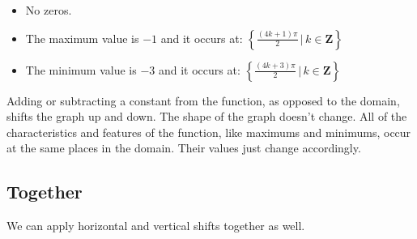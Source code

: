 \documentclass{ximera}
\begin{document}
\begin{example}
\begin{image}
\end{image}



\begin{itemize}
\item No zeros.
\item The maximum value is $-1$ and it occurs at:  $\left\{     \frac{(4k+1)\pi}{2} \, | \, k \in \textbf{Z}     \right\}$
\item The minimum value is $-3$ and it occurs at:  $\left\{    \frac{(4k+3)\pi}{2} \, | \, k \in \textbf{Z}     \right\}$
\end{itemize}














\end{example}






Adding or subtracting a constant from the function, as opposed to the domain, shifts the graph up and down.  The shape of the graph doesn't change.  All of the characteristics and features of the function, like maximums and minimums, occur at the same places in the domain.  Their values just change accordingly.



























\subsection*{Together}

We can apply horizontal and vertical shifts together as well.
\end{document}
